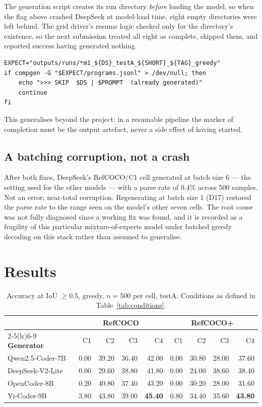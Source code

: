 \documentclass[12pt,a4paper,oneside]{report}
\begin{document}
The generation script creates its run directory \emph{before} loading the model, so
when the flag above crashed DeepSeek at model-load time, eight empty directories were
left behind. The grid driver's resume logic checked only for the directory's
existence, so the next submission treated all eight as complete, skipped them, and
reported success having generated nothing.

\begin{lstlisting}[caption={Completion is tested by the artefact, not by the
container created to hold it.}]
EXPECT="outputs/runs/*m1_${DS}_testA_${SHORT}_${TAG}_greedy"
if compgen -G "$EXPECT/programs.jsonl" > /dev/null; then
    echo ">>> SKIP  $DS | $PROMPT  (already generated)"
    continue
fi
\end{lstlisting}

This generalises beyond the project: in a resumable pipeline the marker of completion
must be the output artefact, never a side effect of having started.

\subsection{A batching corruption, not a crash}

After both fixes, DeepSeek's RefCOCO/C1 cell generated at batch size 6 --- the setting
used for the other models --- with a parse rate of $0.4\%$ across 500 samples. Not an
error; near-total corruption. Regenerating at batch size 1 (D17) restored the parse
rate to the range seen on the model's other seven cells. The root cause was not fully
diagnosed since a working fix was found, and it is recorded as a fragility of this
particular mixture-of-experts model under batched greedy decoding on this stack rather
than assumed to generalise.

\section{Results}

\begin{table}[htbp]\centering\small
\caption{Accuracy at IoU $\geq 0.5$, greedy, $n=500$ per cell, testA. Conditions as
defined in Table~\ref{tab:conditions}.}
\label{tab:m4-main}
\begin{tabular}{@{}lrrrrrrrr@{}}
\toprule
& \multicolumn{4}{c}{\textbf{RefCOCO}} & \multicolumn{4}{c}{\textbf{RefCOCO+}} \\
\cmidrule(lr){2-5}\cmidrule(lr){6-9}
\textbf{Generator} & C1 & C2 & C3 & C4 & C1 & C2 & C3 & C4 \\
\midrule
Qwen2.5-Coder-7B & 0.00 & 39.20 & 36.40 & 42.00 & 0.00 & 30.80 & 28.00 & 37.60 \\
DeepSeek-V2-Lite & 0.00 & 29.60 & 38.80 & 41.80 & 0.00 & 24.00 & 38.60 & 38.40 \\
OpenCoder-8B & 0.20 & 40.80 & 37.40 & 43.20 & 0.00 & 30.20 & 28.00 & 31.60 \\
Yi-Coder-9B & 3.80 & 43.80 & 39.00 & \textbf{45.40} & 0.80 & 34.40 & 35.60 & \textbf{43.80} \\
\bottomrule
\end{tabular}
\end{table}
\end{document}
